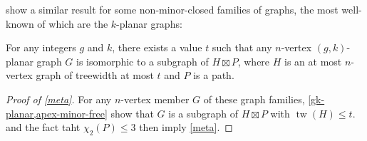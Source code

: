 \documentclass[kpfonts]{patmorin}
\DeclareMathOperator{\tw}{tw}
\newcommand{\trn}{\chi_2}
\theoremstyle{named}
\begin{document}
\citet{dujmovic.morin.ea:structure} show a similar result for some non-minor-closed families of graphs, the most well-known of which are the $k$-planar graphs:

\begin{thm}\label{gk-planar}
    For any integers $g$ and $k$, there exists a value $t$ such that any $n$-vertex $(g,k)$-planar graph $G$ is isomorphic to a subgraph of $H\boxtimes P$, where $H$ is an at most $n$-vertex graph of treewidth at most $t$ and $P$ is a path.
\end{thm}

\begin{proof}[Proof of \cref{meta}]
    For any $n$-vertex member $G$ of these graph families, \cref{gk-planar,apex-minor-free} show that $G$ is a subgraph of $H\boxtimes P$ with $\tw(H)\le t$.   and the fact taht $\trn(P)\le 3$ then imply \cref{meta}.
\end{proof}
\end{document}
